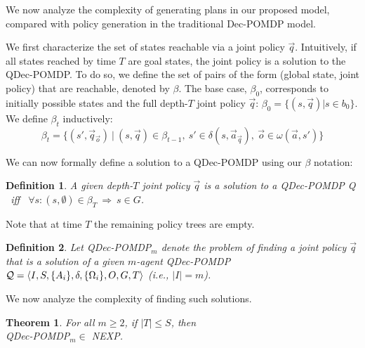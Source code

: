 \documentclass[letterpaper]{article}
\newtheorem{theorem}{Theorem}
\newtheorem{definition}{Definition}
\theoremstyle{definition}
\begin{document}
We now analyze the complexity of generating plans in our proposed model, compared with policy generation in the traditional Dec-POMDP model.

We first characterize the set of states reachable via a joint policy $\vec{q}$. Intuitively, if all states reached by time $T$ are goal states,
the joint policy is a solution to the QDec-POMDP.  To do so, we define the set of pairs of the form (global state, joint policy) that are reachable, denoted by $\beta$.
The base case, $\beta_0$, corresponds to initially possible states and the full depth-$T$ joint policy $\vec{q}$: $\beta_0 = \{(s,\vec{q}) | s \in b_0\}$.  We define $\beta_{t}$ inductively:
\begin{equation} \nonumber
  \beta_{t} = \{ (s', \vec{q}_{\vec{o}}) ~|~
 (s,\vec{q}) \in \beta_{t-1}, ~s' \in \delta(s,\vec{a}_{\vec{q}}), ~\vec{o} \in \omega(\vec{a},s') \}
 \label{eq:bu}
\end{equation}



We can now formally define a solution to a QDec-POMDP using our $\beta$ notation:
\begin{definition}
A given depth-$T$ joint policy $\vec{q}$ is a solution to a QDec-POMDP {\cal Q} ~iff~
$\forall s : (s,\emptyset) \in \beta_T ~\Rightarrow~ s \in G$.
\end{definition}
\noindent Note that at time $T$ the remaining policy trees are empty.

\begin{definition}
Let QDec-POMDP$_m$ denote the problem of finding a joint policy $\vec{q}$ that is a solution of a given $m$-agent
QDec-POMDP ${\cal Q} = \langle  I, S, \{A_i\}, \delta, \{\Omega_i\}, O, G, T\rangle$ (i.e., $|I|=m$).
\end{definition}

We now analyze the complexity of finding such solutions.
\begin{theorem}
For all $m\geq2$, if $|T|\leq S$, then \\ QDec-POMDP$_m \in$ NEXP.
\end{theorem}
\end{document}
